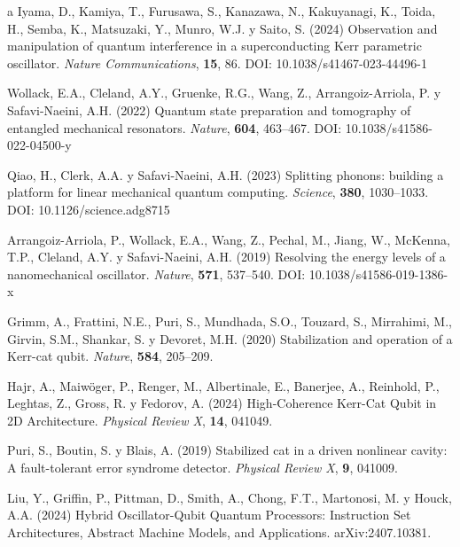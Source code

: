 \documentclass[11pt,a4paper,spanish]{book}
\begin{document}
\begin{thebibliography}{a}
 Iyama, D., Kamiya, T., Furusawa, S., Kanazawa, N., Kakuyanagi, K., Toida, H., Semba, K., Matsuzaki, Y., Munro, W.J. y Saito, S. (2024) Observation and manipulation of quantum interference in a superconducting Kerr parametric oscillator. \textit{Nature Communications}, \textbf{15}, 86. DOI: 10.1038/s41467-023-44496-1

 Wollack, E.A., Cleland, A.Y., Gruenke, R.G., Wang, Z., Arrangoiz-Arriola, P. y Safavi-Naeini, A.H. (2022) Quantum state preparation and tomography of entangled mechanical resonators. \textit{Nature}, \textbf{604}, 463--467. DOI: 10.1038/s41586-022-04500-y

 Qiao, H., Clerk, A.A. y Safavi-Naeini, A.H. (2023) Splitting phonons: building a platform for linear mechanical quantum computing. \textit{Science}, \textbf{380}, 1030--1033. DOI: 10.1126/science.adg8715

 Arrangoiz-Arriola, P., Wollack, E.A., Wang, Z., Pechal, M., Jiang, W., McKenna, T.P., Cleland, A.Y. y Safavi-Naeini, A.H. (2019) Resolving the energy levels of a nanomechanical oscillator. \textit{Nature}, \textbf{571}, 537--540. DOI: 10.1038/s41586-019-1386-x

 Grimm, A., Frattini, N.E., Puri, S., Mundhada, S.O., Touzard, S., Mirrahimi, M., Girvin, S.M., Shankar, S. y Devoret, M.H. (2020) Stabilization and operation of a Kerr-cat qubit. \textit{Nature}, \textbf{584}, 205--209.

 Hajr, A., Maiwöger, P., Renger, M., Albertinale, E., Banerjee, A., Reinhold, P., Leghtas, Z., Gross, R. y Fedorov, A. (2024) High-Coherence Kerr-Cat Qubit in 2D Architecture. \textit{Physical Review X}, \textbf{14}, 041049.

 Puri, S., Boutin, S. y Blais, A. (2019) Stabilized cat in a driven nonlinear cavity: A fault-tolerant error syndrome detector. \textit{Physical Review X}, \textbf{9}, 041009.


 Liu, Y., Griffin, P., Pittman, D., Smith, A., Chong, F.T., Martonosi, M. y Houck, A.A. (2024) Hybrid Oscillator-Qubit Quantum Processors: Instruction Set Architectures, Abstract Machine Models, and Applications. arXiv:2407.10381.


\end{thebibliography}
\end{document}
